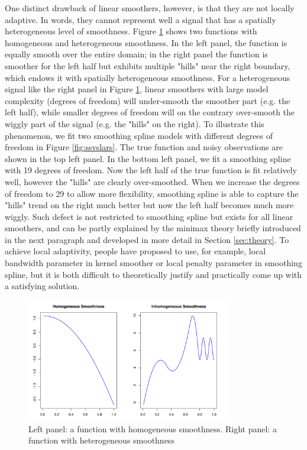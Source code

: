 \documentclass[a4paper]{article}
\begin{document}
One distinct drawback of linear smoothers, however, is that they are not locally adaptive. In words, they cannot represent well a signal that has a spatially heterogeneous level of smoothness. Figure \ref{fig:homo} shows two functions with homogeneous and heterogeneous smoothness. In the left panel, the function is equally smooth over the entire domain; in the right panel the function is smoother for the left half but exhibits multiple "hills" near the right boundary, which endows it with spatially heterogeneous smoothness. For a heterogeneous signal like the right panel in Figure \ref{fig:homo}, linear smoothers with large model complexity (degrees of freedom) will under-smooth the smoother part (e.g. the left half), while smaller degrees of freedom will on the contrary over-smooth the wiggly part of the signal (e.g. the "hills" on the right). To illustrate this phenomenon, we fit two smoothing spline models with different degrees of freedom in Figure \ref{fig:ssvslars}. The true function and noisy observations are shown in the top left panel. In the bottom left panel, we fit a smoothing spline with 19 degrees of freedom. Now the left half of the true function is fit relatively well, however the "hills" are clearly over-smoothed. When we increase the degrees of freedom to 29 to allow more flexibility, smoothing spline is able to capture the "hills" trend on the right much better but now the left half becomes much more wiggly. Such defect is not restricted to smoothing spline but exists for all linear smoothers, and can be partly explained by the minimax theory briefly introduced in the next paragraph and developed in more detail in Section \ref{sec:theory}. To achieve local adaptivity, people have proposed to use, for example, local bandwidth parameter in kernel smoother or local penalty parameter in smoothing spline, but it is both difficult to theoretically justify and practically come up with a satisfying solution.

\begin{figure}[t!]
\centering
\includegraphics[width = 0.8\textwidth]{Figures/homo.pdf}
\caption{Left panel: a function with homogeneous smoothness. Right panel: a function with heterogeneous smoothness}
\label{fig:homo}
\end{figure}
\end{document}
